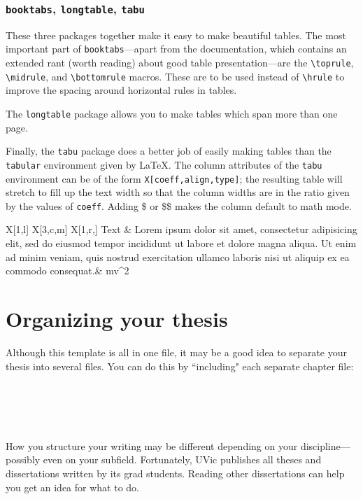 \documentclass[12pt,oneside]{uvicthesis}
\begin{document}
\subsection{\texttt{booktabs}, \texttt{longtable}, \texttt{tabu}}
	These three packages together make it easy to make beautiful tables. The most important part of \texttt{booktabs}---apart from the documentation, which contains an extended rant (worth reading) about good table presentation---are the \texttt{\textbackslash toprule}, \texttt{\textbackslash midrule}, and \texttt{\textbackslash bottomrule} macros. These are to be used instead of \texttt{\textbackslash hrule} to improve the spacing around horizontal rules in tables.
	
	The \texttt{longtable} package allows you to make tables which span more than one page.
	
	Finally, the \texttt{tabu} package does a better job of easily making tables than the \texttt{tabular} environment given by \LaTeX. The column attributes of the \texttt{tabu} environment can be of the form \texttt{X[coeff,align,type]}; the resulting table will stretch to fill up the text width so that the column widths are in the ratio given by the values of \texttt{coeff}. Adding \$ or \$\$ makes the column default to math mode.
	
	\begin{table}[ht]
	\begin{tabu}{X[1,l] X[3,c,m] X[1,r,$$]} 
		\toprule
		Text & 
		Lorem ipsum dolor sit amet, consectetur adipisicing elit, sed do eiusmod tempor incididunt ut labore et dolore magna aliqua. Ut enim ad minim veniam, quis nostrud exercitation ullamco laboris nisi ut aliquip ex ea commodo consequat.&
		mv^2\\
		\bottomrule
	\end{tabu}
	\caption{Example table using \texttt{tabu}}
	\end{table}
	
\chapter{Organizing your thesis}
	Although this template is all in one file, it may be a good idea to separate your thesis into several files. You can do this by ``including" each separate chapter file:
	\begin{verbatim}
	
	
	
	
	\end{verbatim}
How you structure your writing may be different depending on your discipline---possibly even on your subfield. Fortunately, UVic publishes all theses and dissertations written by its grad students. Reading other dissertations can help you get an idea for what to do.
\end{document}
